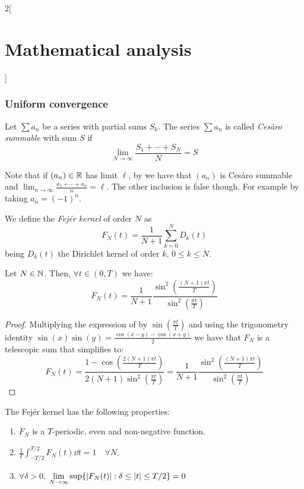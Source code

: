 \documentclass[../../../main_math.tex]{subfiles}
\begin{document}
\begin{multicols}{2}[\section{Mathematical analysis}]
  \subsubsection{Uniform convergence}
  \begin{definition}
    Let $\sum a_n$ be a series with partial sums $S_k$. The series $\sum a_n$ is called \emph{Cesàro summable} with sum $S$ if $$\lim_{N\to\infty}\frac{S_1+\cdots+S_N}{N}=S$$
  \end{definition}
  \begin{remark}
    Note that if $(a_n)\in\mathbb{R}$ has limit $\ell$, by  we have that $(a_n)$ is Cesàro summable and $\displaystyle\lim_{n\to\infty}\frac{a_1+\cdots+a_n}{n}=\ell$. The other inclusion is false though. For example by taking $a_n={(-1)}^n$.
  \end{remark}
  \begin{definition}\label{MA:fejerdef}
    We define the \emph{Fejér kernel} of order $N$ as $$F_N(t)=\frac{1}{N+1}\sum_{k=0}^ND_k(t)$$ being $D_k(t)$ the Dirichlet kernel of order $k$, $0\leq k\leq N$.
  \end{definition}
  \begin{lemma}\label{MA:fejerkernelchar}
    Let $N\in\mathbb{N}$. Then, $\forall t\in(0,T)$ we have:
    $$F_N(t)=\frac{1}{N+1}\frac{\sin^2\left(\frac{(N+1)\pi t}{T}\right)}{\sin^2\left(\frac{\pi t}{T}\right)}$$
  \end{lemma}
  \begin{proof}
    Multiplying the expression of  by $\sin(\frac{\pi t}{T})$ and using the trigonometry identity $\sin(x)\sin(y)=\frac{\cos(x-y)-\cos(x+y)}{2}$ we have that $F_N$ is a telescopic sum that simplifies to:
    $$F_N(t)=\frac{1-\cos(\frac{2(N+1)\pi t}{T})}{2(N+1)\sin^2\left(\frac{\pi t}{T}\right)}=\frac{1}{N+1}\frac{\sin^2\left(\frac{(N+1)\pi t}{T}\right)}{\sin^2\left(\frac{\pi t}{T}\right)}$$
  \end{proof}
  \begin{proposition}\label{MA:fejerprop}
    The Fejér kernel has the following properties:
    \begin{enumerate}
      \item $F_N$ is a $T$-periodic, even and non-negative function.
      \item $\displaystyle\frac{1}{T}\int_{-T/2}^{T/2}F_N(t)\dd{t}=1\quad\forall N$.
      \item $\forall\delta>0$, $\displaystyle\lim_{N\to\infty}\sup\{\abs{F_N(t)}:\delta\leq\abs{t}\leq T/2\}=0$
    \end{enumerate}

\end{proposition}
\end{multicols}
\end{document}
